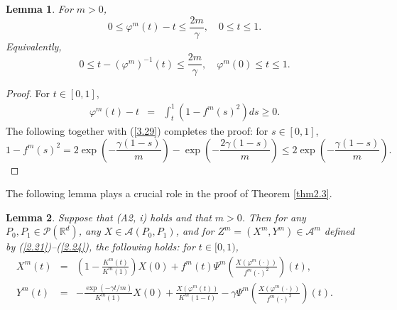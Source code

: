 \documentclass[12pt]{article}
\newtheorem{lemma}{Lemma}[section]
\begin{document}
\begin{lemma}\label{lm3.5}
For $m>0$,
\begin{equation}
0\le \varphi^m(t)-t\le \frac{2m}{\gamma},\quad 0\le t\le 1.
\end{equation}
Equivalently,
\begin{equation}
0\le t-(\varphi^m)^{-1}(t)\le \frac{2m}{\gamma},\quad  \varphi^m(0)\le t\le 1.
\end{equation}
\end{lemma}

\begin{proof}
For $t\in [0,1]$,
\begin{eqnarray}\label{3.29}
\varphi^m(t)-t&=&\int_t^1 (1-f^m(s)^2)ds\ge 0.
\end{eqnarray}
The following together with (\ref{3.29}) completes the proof: for $s\in [0,1]$,
\begin{equation}
1-f^m(s)^2=2\exp\left(-\frac{\gamma (1-s)}{m}\right)-\exp\left(-\frac{2\gamma (1-s)}{m}\right)\le 2\exp\left(-\frac{\gamma (1-s)}{m}\right).
\end{equation}
\end{proof}

The following lemma plays a crucial role in the proof of Theorem \ref{thm2.3}.
\begin{lemma}\label{lm3.6}
Suppose that (A2, i) holds and that $m>0$.
Then  for any $P_0,P_1\in\mathcal{P}(\mathbb{R}^d)$, 
any $X\in\mathcal{A}(P_0,P_1)$, and for $Z^m=(X^m, Y^m)\in \mathcal{A}^{m}$ defined by (\ref{2.21})--(\ref{2.24}), the following holds:
for $t\in [0,1)$,
\begin{eqnarray}
X^m(t)&=&\left(1-\frac{K^m(t)}{K^m(1)}\right)X(0)
+f^m(t)\Psi^m\left(\frac{X(\varphi^m(\cdot))}{f^m(\cdot)^2}\right)(t),\label{3.26}\\
Y^m(t)&=&-\frac{\exp(-\gamma t/m)}{K^m(1)}X(0)
+\frac{X(\varphi^m(t))}{K^m(1-t)}
-\gamma\Psi^m\left(\frac{X(\varphi^m(\cdot))}{f^m(\cdot)^2}\right)(t).\qquad\label{2.27}
\end{eqnarray}
\end{lemma}
\end{document}
